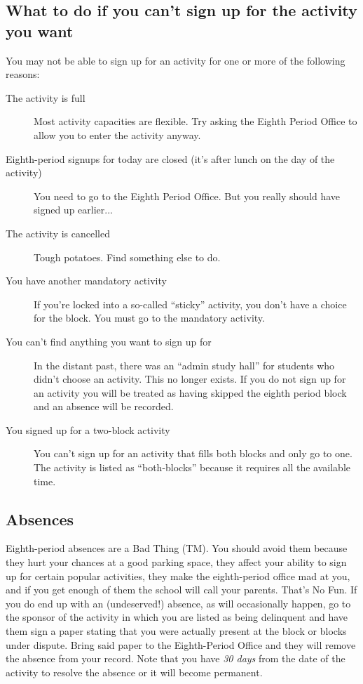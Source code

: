 \documentclass[11pt,letterpaper]{report}
\begin{document}
\subsection{What to do if you can't sign up for the activity you want}
You may not be able to sign up for an activity for one or more of the following reasons:
\begin{description}
\item[The activity is full]
	Most activity capacities are flexible.
	Try asking the Eighth Period Office to allow you to enter the activity anyway.
\item[Eighth-period signups for today are closed (it's after lunch on the day of the activity)]
	You need to go to the Eighth Period Office.  But you really should have signed up earlier...
\item[The activity is cancelled]
	Tough potatoes.  Find something else to do.
\item[You have another mandatory activity]
	If you're locked into a so-called ``sticky'' activity, you don't have a choice for the block.
	You must go to the mandatory activity.
\item[You can't find anything you want to sign up for]
	In the distant past, there was an ``admin study hall'' for students who didn't choose an activity.
	This no longer exists.  If you do not sign up for an activity you will be treated as having skipped
	the eighth period block and an absence will be recorded.
\item[You signed up for a two-block activity]
	You can't sign up for an activity that fills both blocks and only go to one.
	The activity is listed as ``both-blocks'' because it requires all the available time.
\end{description}
\subsection{Absences}
Eighth-period absences are a Bad Thing (TM).  You should avoid them because they hurt your chances at a good parking space,
they affect your ability to sign up for certain popular activities, they make the eighth-period office mad at you, and if
you get enough of them the school will call your parents.  That's No Fun.  If you do end up with an (undeserved!) absence,
as will occasionally happen, go to the sponsor of the activity in which you are listed as being delinquent and have them
sign a paper stating that you were actually present at the block or blocks under dispute.  Bring said paper to the Eighth-Period
Office and they will remove the absence from your record.  Note that you have \emph{30 days} from the date of the activity to
resolve the absence or it will become permanent.
\end{document}

